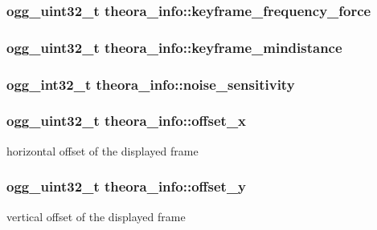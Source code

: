 \subsubsection[{keyframe\_\-frequency\_\-force}]{\setlength{\rightskip}{0pt plus 5cm}ogg\_\-uint32\_\-t {\bf theora\_\-info::keyframe\_\-frequency\_\-force}}\label{structtheora__info_ad9d2e22c44a53473010e6d1042dfe0d8}
\subsubsection[{keyframe\_\-mindistance}]{\setlength{\rightskip}{0pt plus 5cm}ogg\_\-uint32\_\-t {\bf theora\_\-info::keyframe\_\-mindistance}}\label{structtheora__info_aa79ca8c0e77a884d4487fd627fae32e9}
\subsubsection[{noise\_\-sensitivity}]{\setlength{\rightskip}{0pt plus 5cm}ogg\_\-int32\_\-t {\bf theora\_\-info::noise\_\-sensitivity}}\label{structtheora__info_ac4789034f547b57d1075e035050eeed9}
\subsubsection[{offset\_\-x}]{\setlength{\rightskip}{0pt plus 5cm}ogg\_\-uint32\_\-t {\bf theora\_\-info::offset\_\-x}}\label{structtheora__info_af5949a02bef29512f2705e6f6c944e3b}


horizontal offset of the displayed frame 

\subsubsection[{offset\_\-y}]{\setlength{\rightskip}{0pt plus 5cm}ogg\_\-uint32\_\-t {\bf theora\_\-info::offset\_\-y}}\label{structtheora__info_a91c3922097ba32a85acd584a01dc2c93}


vertical offset of the displayed frame 

